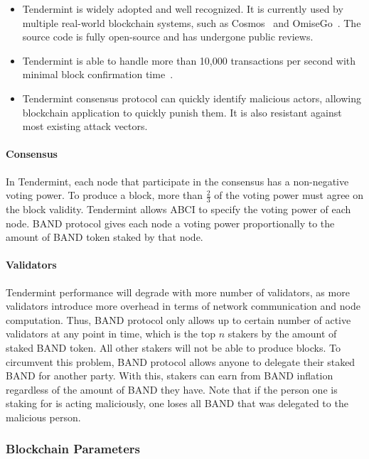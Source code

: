 \documentclass[letterpaper,11pt]{article}
\begin{document}
\begin{itemize}
\setlength\itemsep{0em}
\item Tendermint is widely adopted and well recognized. It is currently used by multiple real-world blockchain systems, such as Cosmos~\cite{cosmoswhitepaper} and OmiseGo~\cite{omgtendermint}. The source code is fully open-source and has undergone public reviews.
\item Tendermint is able to handle more than 10,000 transactions per second with minimal block confirmation time~\cite{tendermint10k}.
\item Tendermint consensus protocol can quickly identify malicious actors, allowing blockchain application to quickly punish them. It is also resistant against most existing attack vectors.
\end{itemize}

\paragraph{Consensus}
In Tendermint, each node that participate in the consensus has a non-negative voting power. To produce a block, more than $\frac{2}{3}$ of the voting power must agree on the block validity. Tendermint allows ABCI to specify the voting power of each node. BAND protocol gives each node a voting power proportionally to the amount of BAND token staked by that node.

\paragraph{Validators}
Tendermint performance will degrade with more number of validators, as more validators introduce more overhead in terms of network communication and node computation. Thus, BAND protocol only allows up to certain number of active validators at any point in time, which is the top $n$ stakers by the amount of staked BAND token. All other stakers will not be able to produce blocks. To circumvent this problem, BAND protocol allows anyone to delegate their staked BAND for another party. With this, stakers can earn from BAND inflation regardless of the amount of BAND they have. Note that if the person one is staking for is acting maliciously, one loses all BAND that was delegated to the malicious person.

\subsubsection{Blockchain Parameters}
\end{document}
